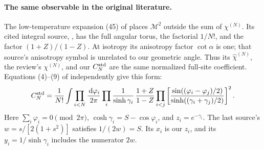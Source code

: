 \documentclass[11pt]{article}
\numberwithin{equation}{section}
\theoremstyle{definition}
\newcommand{\dd}{\,\mathrm d}
\newcommand{\M}{\mathcal M}
\begin{document}
\paragraph{The same observable in the original literature.}
The low-temperature expansion (45) of \cite{McCoyMaillard2012}
places \(\M^2\) outside the sum of \(\chi^{(N)}\).
Its cited integral source, \cite[(1.10), (3.13), (3.17)--(3.20)]{Orrick2001},
has the full angular torus, the factorial \(1/N!\), and the factor
\((1+Z)/(1-Z)\). At isotropy its anisotropy factor \(\cot\alpha\)
is one; that source's anisotropy symbol is unrelated to our geometric
angle. Thus its \(\widehat\chi^{(N)}\), the review's \(\chi^{(N)}\),
and our \(C_N^{\rm std}\) are the same normalized full-site coefficient.
Equations (4)--(9) of \cite{Boukraa2008} independently give this form:
\[
 C_N^{\rm std}=\frac1{N!}
 \int\prod_{i<N}\frac{\dd\varphi_i}{2\pi}
 \prod_i\frac1{\sinh\gamma_i}\,
 \frac{1+Z}{1-Z}
 \prod_{i<j}\left[
  \frac{\sin((\varphi_i-\varphi_j)/2)}
       {\sinh((\gamma_i+\gamma_j)/2)}
             \right]^2 .
\]
Here \(\sum_i\varphi_i=0\pmod{2\pi}\),
\(\cosh\gamma_i=S-\cos\varphi_i\), and \(z_i=e^{-\gamma_i}\).
The last source's \(w=s/[2(1+s^2)]\) satisfies \(1/(2w)=S\).
Its \(x_i\) is our \(z_i\), and its \(y_i=1/\sinh\gamma_i\)
includes the numerator \(2w\).
\end{document}
